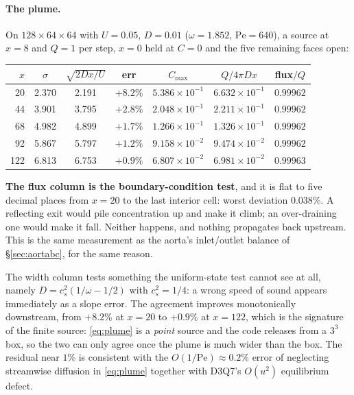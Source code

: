 \documentclass[11pt,a4paper]{article}
\begin{document}
\paragraph{The plume.} On $128\times64\times64$ with $U=0.05$, $D=0.01$
($\omega=1.852$, $\mathrm{Pe}=640$), a source at $x=8$ and $Q=1$ per step,
$x=0$ held at $C=0$ and the five remaining faces open:

\begin{center}
\begin{tabular}{rcccccc}
\toprule
$x$ & $\sigma$ & $\sqrt{2Dx/U}$ & err & $C_{\max}$ & $Q/4\pi Dx$ & flux$/Q$ \\
\midrule
 20 & 2.370 & 2.191 & $+8.2\%$ & $5.386\times10^{-1}$ & $6.632\times10^{-1}$ & $0.99962$ \\
 44 & 3.901 & 3.795 & $+2.8\%$ & $2.048\times10^{-1}$ & $2.211\times10^{-1}$ & $0.99962$ \\
 68 & 4.982 & 4.899 & $+1.7\%$ & $1.266\times10^{-1}$ & $1.326\times10^{-1}$ & $0.99962$ \\
 92 & 5.867 & 5.797 & $+1.2\%$ & $9.158\times10^{-2}$ & $9.474\times10^{-2}$ & $0.99962$ \\
122 & 6.813 & 6.753 & $+0.9\%$ & $6.807\times10^{-2}$ & $6.981\times10^{-2}$ & $0.99963$ \\
\bottomrule
\end{tabular}
\end{center}

\noindent \textbf{The flux column is the boundary-condition test}, and it is
flat to five decimal places from $x=20$ to the last interior cell: worst
deviation $0.038\%$. A reflecting exit would pile concentration up and make it
climb; an over-draining one would make it fall. Neither happens, and nothing
propagates back upstream. This is the same measurement as the aorta's
inlet/outlet balance of \S\ref{sec:aortabc}, for the same reason.

The width column tests something the uniform-state test cannot see at all,
namely $D = c_s^2(1/\omega - 1/2)$ with $c_s^2 = 1/4$: a wrong speed of sound
appears immediately as a slope error. The agreement improves monotonically
downstream, from $+8.2\%$ at $x=20$ to $+0.9\%$ at $x=122$, which is the
signature of the finite source: \eqref{eq:plume} is a \emph{point} source and
the code releases from a $3^3$ box, so the two can only agree once the plume is
much wider than the box. The residual near $1\%$ is consistent with the
$O(1/\mathrm{Pe}) \approx 0.2\%$ error of neglecting streamwise diffusion in
\eqref{eq:plume} together with D3Q7's $O(u^2)$ equilibrium defect.
\end{document}
